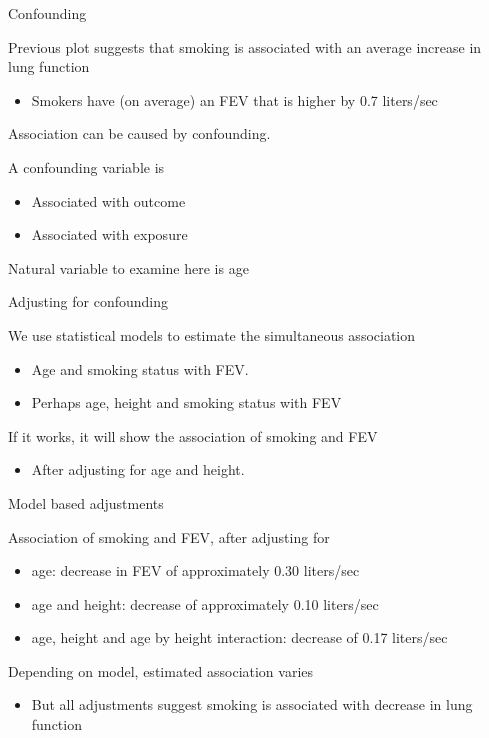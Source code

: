 \documentclass[ignorenonframetext,]{beamer}
\begin{document}
\begin{frame}{Confounding}

Previous plot suggests that smoking is associated with an average
increase in lung function

\begin{itemize}
\itemsep1pt\parskip0pt
\item
  Smokers have (on average) an FEV that is higher by 0.7 liters/sec
\end{itemize}

Association can be caused by confounding.

A confounding variable is

\begin{itemize}
\item
  Associated with outcome
\item
  Associated with exposure
\end{itemize}

Natural variable to examine here is age

\end{frame}

\begin{frame}{Adjusting for confounding}

We use statistical models to estimate the simultaneous association

\begin{itemize}
\item
  Age and smoking status with FEV.
\item
  Perhaps age, height and smoking status with FEV
\end{itemize}

If it works, it will show the association of smoking and FEV

\begin{itemize}
\itemsep1pt\parskip0pt
\item
  After adjusting for age and height.
\end{itemize}

\end{frame}

\begin{frame}{Model based adjustments}

Association of smoking and FEV, after adjusting for

\begin{itemize}
\item
  age: decrease in FEV of approximately 0.30 liters/sec
\item
  age and height: decrease of approximately 0.10 liters/sec
\item
  age, height and age by height interaction: decrease of 0.17 liters/sec
\end{itemize}

Depending on model, estimated association varies

\begin{itemize}
\itemsep1pt\parskip0pt
\item
  But all adjustments suggest smoking is associated with decrease in
  lung function
\end{itemize}

\end{frame}
\end{document}
